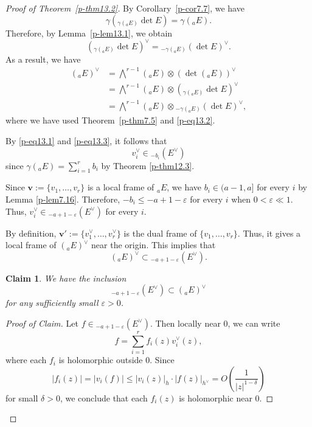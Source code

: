 \documentclass[12pt,twoside]{amsart}
\newtheorem*{claim}{Claim}
\theoremstyle{definition}
\begin{document}
\begin{proof}[Proof of Theorem~\ref{p-thm13.2}] 
By Corollary~\ref{p-cor7.7}, we have 
\[
\gamma \left({}_{\gamma ({}_a E)} \det E\right) = \gamma ({}_a E).
\] 
Therefore, by Lemma~\ref{p-lem13.1}, we obtain 
\begin{equation}\label{p-eq13.2} 
\left({}_{\gamma ({}_a E)} \det E\right)^\vee = {}_{-\gamma ({}_a E)} (\det E)^\vee.
\end{equation}
As a result, we have
\begin{equation}\label{p-eq13.3}
\begin{aligned}
\left({}_a E\right)^\vee 
&= \bigwedge^{r-1} \left({}_a E\right) \otimes 
\left(\det({}_a E)\right)^\vee \\
&= \bigwedge^{r-1} \left({}_a E\right) \otimes 
\left({}_{\gamma({}_a E)} \det E\right)^\vee \\
&= \bigwedge^{r-1} \left({}_a E\right) 
\otimes {}_{-\gamma({}_a E)} \left(\det E\right)^\vee,
\end{aligned}
\end{equation}
where we have used Theorem~\ref{p-thm7.5} and \eqref{p-eq13.2}.

By \eqref{p-eq13.1} and \eqref{p-eq13.3}, it follows that 
\[
v^\vee _i \in {}_{-b_i} (E^\vee)
\] 
since $\gamma ({}_a E)=\sum _{i=1}^r b_i$ by Theorem \ref{p-thm12.3}. 

Since $\bm v:=\{v_1, \ldots, v_r\}$ is a local frame of ${}_a E$, 
we have $b_i\in (a-1, a]$ for every $i$ by Lemma \ref{p-lem7.16}. 
Therefore, $-b_i\leq -a+1-\varepsilon$ for every $i$ when $0<\varepsilon \ll 1$. 
Thus, $v^\vee _i\in {}_{-a +1-\varepsilon} (E^\vee)$ for 
every $i$. 

By definition, $\bm v':=\{v_1^\vee, \ldots, v_r^\vee\}$ is 
the dual frame of $\{v_1, \ldots, v_r\}$. Thus, it gives a local 
frame of $({}_a E)^\vee$ near the origin. 
This implies that 
\begin{equation}\label{p-eq13.4}
({}_a E)^\vee \subset {}_{-a+1-\varepsilon} (E^\vee). 
\end{equation}


\begin{claim}
We have the inclusion
\[
{}_{-a + 1 - \varepsilon}(E^\vee) \subset \left({}_a E\right)^\vee
\]
for any sufficiently small $\varepsilon > 0$.
\end{claim}

\begin{proof}[Proof of Claim]
Let $f \in {}_{-a + 1 - \varepsilon}(E^\vee)$. Then locally near $0$, we can write
\[
f = \sum_{i=1}^r f_i(z) v_i^\vee(z),
\]
where each $f_i$ is holomorphic outside $0$. Since
\[
|f_i(z)| = |v_i(f)| \leq |v_i(z)|_h 
\cdot |f(z)|_{h^\vee} = O\left( \frac{1}{|z|^{1 - \delta}} \right)
\]
for small $\delta > 0$, we conclude that each $f_i(z)$ is holomorphic near $0$.


\end{proof}
\end{proof}
\end{document}
